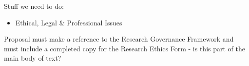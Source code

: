 Stuff we need to do:
\begin{itemize}
    \item Ethical, Legal \& Professional Issues
\end{itemize}

Proposal must make a reference to the Research Governance Framework and must include a completed copy for the Research Ethics Form - is this part of the main body of text?